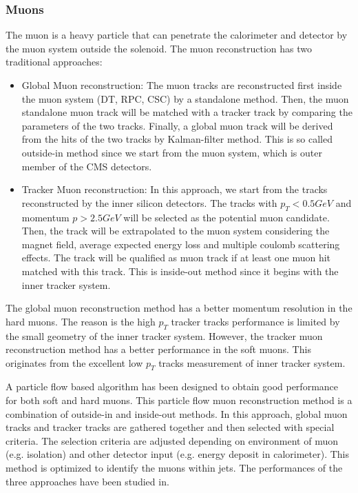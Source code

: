 \subsubsection{Muons}
The muon is a heavy particle that can penetrate the calorimeter and detector by the muon system outside the solenoid. The muon reconstruction has two traditional approaches: 

\begin{itemize}
	\item Global Muon reconstruction: The muon tracks are reconstructed first inside the muon system (DT, RPC, CSC) by a standalone method. Then, the muon standalone muon track will be matched with a tracker track by comparing the parameters of the two tracks. Finally, a global muon track will be derived from the hits of the two tracks by Kalman-filter method\cite{Fruhwirth:1987fm}. This is so called outside-in method since we start from the muon system, which is outer member of the CMS detectors. 
  \item Tracker Muon reconstruction: In this approach, we start from the tracks reconstructed by the inner silicon detectors. The tracks with $p_{T}<0.5 GeV$ and momentum $p>2.5GeV$ will be selected as the potential muon candidate. Then, the track will be extrapolated to the muon system considering the magnet field, average expected energy loss and multiple coulomb scattering effects. The track will be qualified as muon track if at least one muon hit matched with this track. This is inside-out method since it begins with the inner tracker system. 
\end{itemize}

The global muon reconstruction method has a better momentum resolution in the hard muons. The reason is the high $p_{T}$ tracker tracks performance is limited by the small geometry of the inner tracker system. However, the tracker muon reconstruction method has a better performance in the soft muons. This originates from the excellent low $p_{T}$ tracks measurement of inner tracker system. 

A particle flow based algorithm has been designed to obtain good performance for both soft and hard muons. This particle flow muon reconstruction method is a combination of outside-in and inside-out methods. In this approach, global muon tracks and tracker tracks are gathered together and then selected with special criteria. The selection criteria are adjusted depending on environment of muon (e.g. isolation) and other detector input (e.g. energy deposit in calorimeter). This method is optimized to identify the muons within jets. The performances of the three approaches have been studied in\cite{Chatrchyan:2012xi}. 
